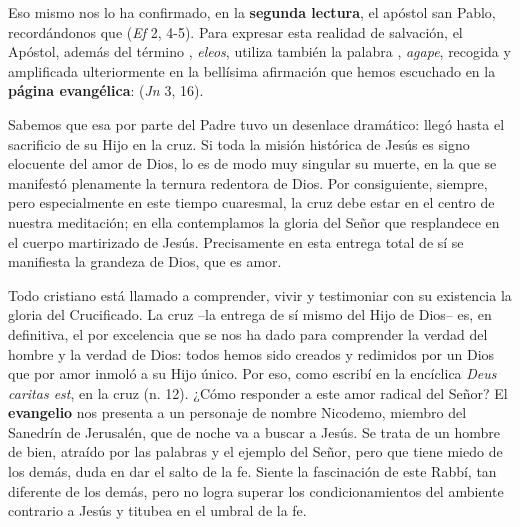 \begin{body}
Eso mismo nos lo ha confirmado, en la \textbf{segunda lectura}, el apóstol san Pablo, recordándonos que  (\textit{Ef} 2, 4-5). Para expresar esta realidad de salvación, el Apóstol, además del término , \textit{eleos}, utiliza también la palabra , \textit{agape}, recogida y amplificada ulteriormente en la bellísima afirmación que hemos escuchado en la \textbf{página evangélica}:  (\textit{Jn} 3, 16).

Sabemos que esa  por parte del Padre tuvo un desenlace dramático: llegó hasta el sacrificio de su Hijo en la cruz. Si toda la misión histórica de Jesús es signo elocuente del amor de Dios, lo es de modo muy singular su muerte, en la que se manifestó plenamente la ternura redentora de Dios. Por consiguiente, siempre, pero especialmente en este tiempo cuaresmal, la cruz debe estar en el centro de nuestra meditación; en ella contemplamos la gloria del Señor que resplandece en el cuerpo martirizado de Jesús. Precisamente en esta entrega total de sí se manifiesta la grandeza de Dios, que es amor.

Todo cristiano está llamado a comprender, vivir y testimoniar con su existencia la gloria del Crucificado. La cruz –la entrega de sí mismo del Hijo de Dios– es, en definitiva, el  por excelencia que se nos ha dado para comprender la verdad del hombre y la verdad de Dios: todos hemos sido creados y redimidos por un Dios que por amor inmoló a su Hijo único. Por eso, como escribí en la encíclica \textit{Deus caritas est}, en la cruz  (n. 12). ¿Cómo responder a este amor radical del Señor? El \textbf{evangelio} nos presenta a un personaje de nombre Nicodemo, miembro del Sanedrín de Jerusalén, que de noche va a buscar a Jesús. Se trata de un hombre de bien, atraído por las palabras y el ejemplo del Señor, pero que tiene miedo de los demás, duda en dar el salto de la fe. Siente la fascinación de este Rabbí, tan diferente de los demás, pero no logra superar los condicionamientos del ambiente contrario a Jesús y titubea en el umbral de la fe.


\end{body}

